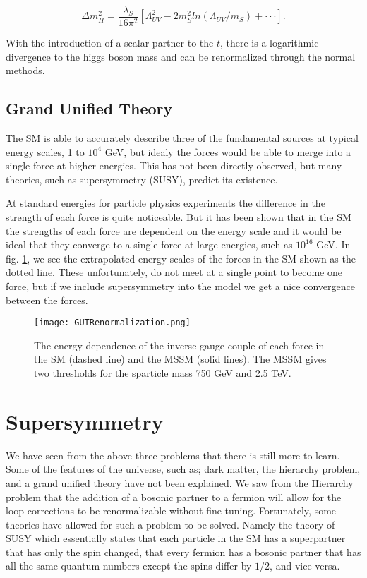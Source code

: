 \begin{equation}
\Delta m_{H}^{2}=\frac{\lambda_{S}}{16\pi^{2}}[\Lambda_{UV}^{2} - 2m_{S}^{2}ln(\Lambda_{UV}/m_{S})+\cdot\cdot\cdot].
\label{HiggsRenormalization}
\end{equation}

With the introduction of a scalar partner to the $t$, there is a logarithmic divergence to the higgs boson mass and can be renormalized through the normal methods.

\subsection{Grand Unified Theory}

The SM is able to accurately describe three of the fundamental sources at typical energy scales, 1 to $10^{4}$ GeV, but idealy the forces would be able to merge into a single force at higher energies. This has not been directly observed, but many theories, such as supersymmetry (SUSY), predict its existence.%

At standard energies for particle physics experiments the difference in the strength of each force is quite noticeable. But it has been shown that in the SM the strengths of each force are dependent on the energy scale and it would be ideal that they converge to a single force at large energies, such as $10^{16}$ GeV. In fig. \ref{GUT}, we see the extrapolated energy scales of the forces in the SM shown as the dotted line. These unfortunately, do not meet at a single point to become one force, but if we include supersymmetry into the model we get a nice convergence between the forces.

\begin{figure}
 	\centering
	\texttt{[image: GUTRenormalization.png]}
 	\caption{The energy dependence of the inverse gauge couple of each force in the SM (dashed line) and the MSSM (solid lines). The MSSM gives two thresholds for the sparticle mass 750 GeV and 2.5 TeV.}
 	\label{GUT} 
\end{figure}

\section{Supersymmetry}

We have seen from the above three problems that there is still more to learn. Some of the features of the universe, such as; dark matter, the hierarchy problem, and a grand unified theory have not been explained. We saw from the Hierarchy problem that the addition of a bosonic partner to a fermion will allow for the loop corrections to be renormalizable without fine tuning. Fortunately, some theories have allowed for such a problem to be solved. Namely the theory of SUSY which essentially states that each particle in the SM has a superpartner that has only the spin changed, that every fermion has a bosonic partner that has all the same quantum numbers except the spins differ by $1/2$, and vice-versa.

